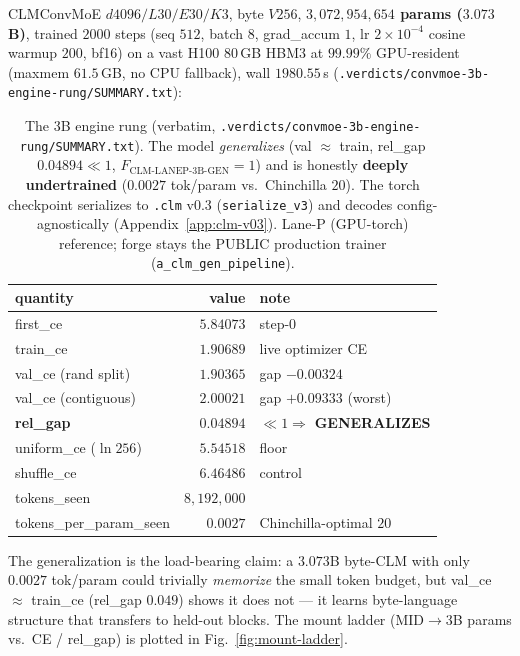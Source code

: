 CLMConvMoE $d4096/L30/E30/K3$, byte $V256$, \textbf{$3{,}072{,}954{,}654$ params
($3.073$B)}, trained $2000$ steps (seq $512$, batch $8$, grad\_accum $1$,
lr $2\!\times\!10^{-4}$ cosine warmup $200$, bf16) on a vast H100 80\,GB HBM3 at
$99.99\%$ GPU-resident (maxmem $61.5$\,GB, no CPU fallback), wall $1980.55$\,s
(\texttt{.verdicts/convmoe-3b-engine-rung/SUMMARY.txt}):
\begin{table}[h]
\centering
\small
\setlength{\tabcolsep}{8pt}
\begin{tabular}{@{}l r l@{}}
\toprule
\textbf{quantity} & \textbf{value} & \textbf{note} \\
\midrule
first\_ce            & $5.84073$ & step-0 \\
train\_ce            & $1.90689$ & live optimizer CE \\
val\_ce (rand split) & $1.90365$ & gap $-0.00324$ \\
val\_ce (contiguous) & $2.00021$ & gap $+0.09333$ (worst) \\
\textbf{rel\_gap}    & $\mathbf{0.04894}$ & $\ll1\Rightarrow$ \textbf{GENERALIZES} \\
uniform\_ce ($\ln256$) & $5.54518$ & floor \\
shuffle\_ce          & $6.46486$ & control \\
tokens\_seen         & $8{,}192{,}000$ & \\
tokens\_per\_param\_seen & $0.0027$ & Chinchilla-optimal $20$ \\
\bottomrule
\end{tabular}
\caption{The 3B engine rung (verbatim,
\texttt{.verdicts/convmoe-3b-engine-rung/SUMMARY.txt}). The model
\emph{generalizes} (val $\approx$ train, rel\_gap $0.04894\ll1$,
$F_\text{CLM-LANEP-3B-GEN}=1$) and is honestly \textbf{deeply undertrained}
($0.0027$ tok/param vs.\ Chinchilla $20$). The torch checkpoint serializes to
\texttt{.clm} v0.3 (\texttt{serialize\_v3}) and decodes config-agnostically
(Appendix~\ref{app:clm-v03}). Lane-P (GPU-torch) reference; forge stays the
PUBLIC production trainer (\texttt{a\_clm\_gen\_pipeline}).}
\label{tab:fm-3b}
\end{table}

The generalization is the load-bearing claim: a $3.073$B byte-CLM with only
$0.0027$ tok/param could trivially \emph{memorize} the small token budget, but
val\_ce $\approx$ train\_ce (rel\_gap $0.049$) shows it does not --- it learns
byte-language structure that transfers to held-out blocks. The mount ladder
(MID$\rightarrow$3B params vs.\ CE / rel\_gap) is plotted in
Fig.~\ref{fig:mount-ladder}.

